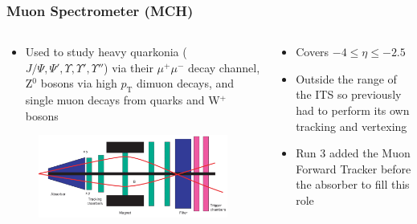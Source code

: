 \documentclass[11pt]{beamer}
\begin{document}
\begin{frame}
    \frametitle{Muon Spectrometer (MCH)}

    \begin{columns}[t]
        \begin{column}{0.6\textwidth}
            \begin{itemize}
                \item Used to study heavy quarkonia ($J/\Psi,\Psi',\Upsilon,\Upsilon',\Upsilon''$) via their $\mu^+\mu^-$ decay channel, Z$^0$ bosons via high $p_\mathrm{T}$ dimuon decays, and single muon decays from quarks and W$^+$ bosons
            \end{itemize}
            \begin{figure}[h]
                \begin{center}
                    \includegraphics[width=\textwidth]{Figs/MCH_schematic.png}
                \end{center}
            \end{figure}
        \end{column}

        \begin{column}{0.4\textwidth}
            \begin{itemize}
                \item Covers $-4\leq\eta\leq -2.5$
                \item Outside the range of the ITS so previously had to perform its own tracking and vertexing
                \item Run 3 added the Muon Forward Tracker before the absorber to fill this role
            \end{itemize}
        \end{column}
    \end{columns}

\end{frame}
\end{document}
